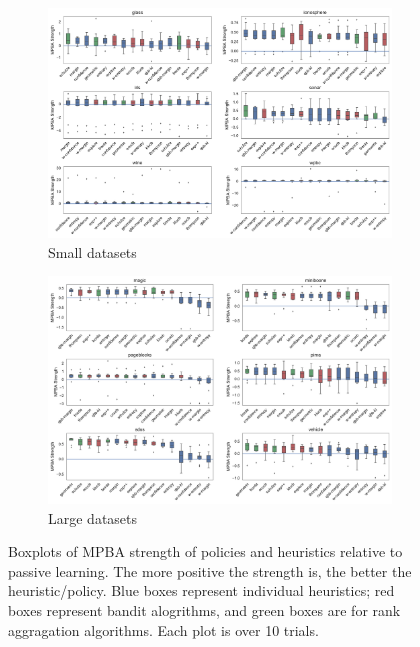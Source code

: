 \documentclass[fleqn,10pt,lineno]{wlpeerj} %
\begin{document}
\begin{figure}[tbp]
	\centering
	\begin{subfigure}[t]{\textwidth}
        \centering
        \includegraphics[width=\textwidth]{figures/strengths-mpba-small}
        \caption{Small datasets}
	\end{subfigure}
	\begin{subfigure}[t]{\textwidth}
        \centering
        \includegraphics[width=\textwidth]{figures/strengths-mpba-large}
        \caption{Large datasets}
    \end{subfigure}
	\caption[Policy strength]{Boxplots of MPBA strength of policies and
	heuristics relative to passive learning. The more positive the strength is,
	the better the heuristic/policy. Blue boxes represent individual
	heuristics; red boxes represent bandit alogrithms, and green boxes are for
	rank aggragation algorithms. Each plot is over 10 trials.}
	\label{fig:strengths-mpba}
\end{figure}
\end{document}
